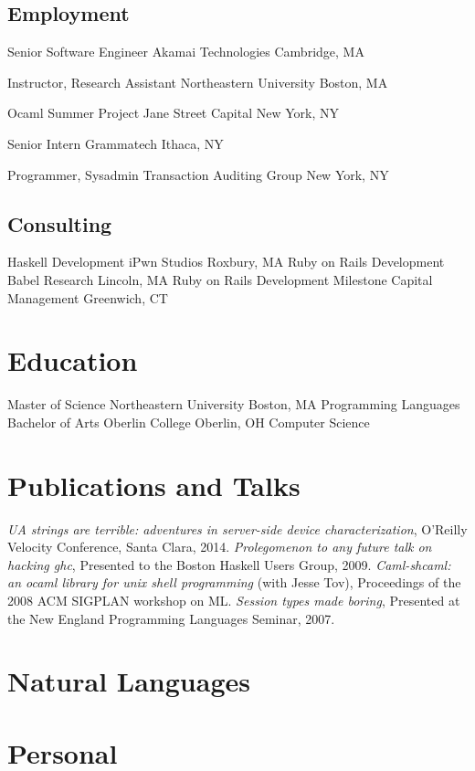 \documentclass[10pt,letterpaper,sans]{moderncv}
\begin{document}
\subsection{Employment}

        {Senior Software Engineer}
        {Akamai Technologies}
        {Cambridge, MA}
        {}{}

        {Instructor, Research Assistant}
        {Northeastern University}
        {Boston, MA}
        {}{}

        {Ocaml Summer Project}
        {Jane Street Capital}
        {New York, NY}
        {}{}

        {Senior Intern}
        {Grammatech}
        {Ithaca, NY}
        {}{}

        {Programmer, Sysadmin}
        {Transaction Auditing Group}
        {New York, NY}
        {}{}

\subsection{Consulting}

        {Haskell Development}
        {iPwn Studios}
        {Roxbury, MA}
        {}{}
\cventry{}
        {Ruby on Rails Development}
        {Babel Research}
        {Lincoln, MA}
        {}{}
\cventry{}
        {Ruby on Rails Development}
        {Milestone Capital Management}
        {Greenwich, CT}
        {}{}

\section{Education}

        {Master of Science}
        {Northeastern University}
        {Boston, MA}
        {}
        {Programming Languages}
        {Bachelor of Arts}
        {Oberlin College}
        {Oberlin, OH}
        {}
        {Computer Science}

\section{Publications and Talks}

\cvitem{}
 {\emph{UA strings are terrible: adventures in server-side device characterization},
   O'Reilly Velocity Conference, Santa Clara, 2014.}
\cvitem{}
 {\emph{Prolegomenon to any future talk on hacking ghc},
  Presented to the Boston Haskell Users Group, 2009.}
\cvitem{}
 {\emph{Caml-shcaml: an ocaml library for unix shell programming} (with Jesse Tov),
  Proceedings of the 2008 ACM SIGPLAN workshop on ML.}
\cvitem{}
 {\emph{Session types made boring},
  Presented at the New England Programming Languages Seminar, 2007.}

\section{Natural Languages}

  
\section{Personal}

\end{document}
